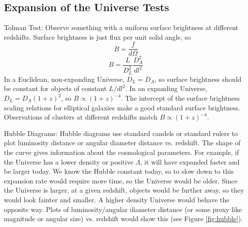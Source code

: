 \subsection{Expansion of the Universe Tests}
Tolman Test:\newline
Observe something with a uniform surface brightness at different redshifts.  
Surface brightness is just flux per unit solid angle, so 
\begin{equation}
B=\frac{f}{d\Omega}
\end{equation}
\begin{equation}
B=\frac{L}{D_L^2}\frac{D_A^2}{dl^2}
\end{equation}
In a Euclidean, non-expanding Universe, $D_L=D_A$, so surface brightness should 
be constant for objects of constant $L/dl^2$.  In an expanding Universe, 
$D_L=D_A(1+z)^2$, so $B\propto(1+z)^{-4}$.  The intercept of the surface 
brightness scaling relations for elliptical galaxies make a good standard 
surface brightness.  Observations of clusters at different redshifts match 
$B\propto(1+z)^{-4}$.  

Hubble Diagrams:\newline
Hubble diagrams use standard candels or standard rulers to plot luminosity 
distance or angular diameter distance vs. redshift.  The shape of the 
curve gives information about the cosmological parameters.  For example, 
if the Universe has a lower density or positive $\Lambda$, it will have 
expanded faster and be larger today.  We know the Hubble constant today, 
so to slow down to this expansion rate would require more time, so the 
Universe would be older.  Since the Universe is larger, at a given 
redshift, objects would be further away, so they would look fainter and 
smaller.  A higher density Universe would behave the opposite way.  Plots 
of luminosity/angular diameter distance (or some proxy like magnitude or 
angular size) vs. redshift would show this (see Figure \ref{fig:hubble}).

